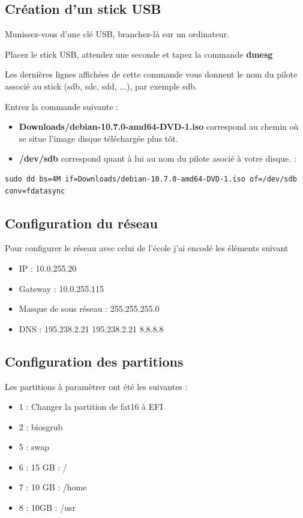 \documentclass[12pt,a4paper]{article}
\begin{document}
\begin{flushleft}
       \subsection{Création d'un stick USB}
       \item Munissez-vous d'une clé USB, branchez-là sur un ordinateur.
       \item Placez le stick USB, attendez une seconde et tapez la commande \textbf{dmesg}
       \item Les dernières lignes affichées de cette commande vous donnent le nom du pilote associé au stick (sdb,
sdc, sdd, ...), par exemple sdb.
        \item Entrez la commande suivante : 
        \begin{itemize}
            \item \textbf{Downloads/debian-10.7.0-amd64-DVD-1.iso} correspond au chemin où se situe l'image disque téléchargée plus tôt. 
            \item \textbf{/dev/sdb} correspond quant à lui au nom du pilote asocié à votre disque. : 
        \end{itemize}
        \begin{lstlisting}
sudo dd bs=4M if=Downloads/debian-10.7.0-amd64-DVD-1.iso of=/dev/sdb conv=fdatasync
        \end{lstlisting}
        

       \subsection{Configuration du réseau}
       \item Pour configurer le réseau avec celui de l'école j'ai encodé les éléments suivant
       \begin{itemize}
           \item IP : 10.0.255.20
           \item Gateway : 10.0.255.115
           \item Masque de sous réseau : 255.255.255.0
           \item DNS : 195.238.2.21 195.238.2.21 8.8.8.8
       \end{itemize}
       \subsection{Configuration des partitions}
       \item Les partitions à paramètrer ont été les suivantes : 
       \begin{itemize}
           \item 1 : Changer la partition de fat16 à EFI
           \item 2 : biosgrub
           \item 5 : swap
           \item 6 : 15 GB : / 
           \item 7 : 10 GB : /home
           \item 8 : 10GB : /usr 
       \end{itemize}

\end{flushleft}
\end{document}
